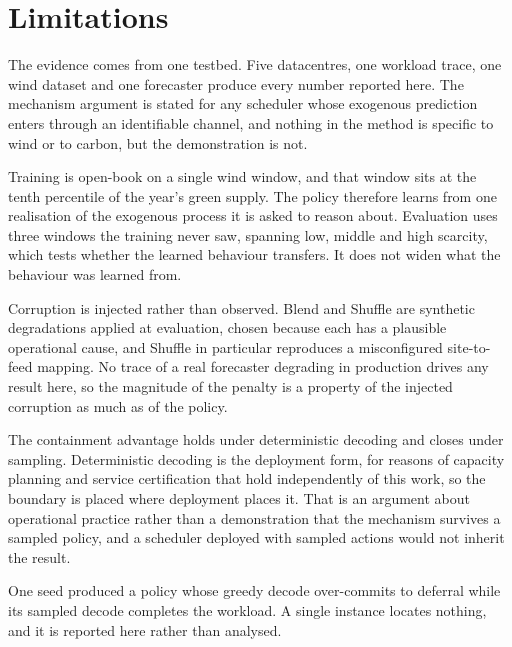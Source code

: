 
\section{Limitations}
\label{sec:limitations}
The evidence comes from one testbed. Five datacentres, one workload trace, one wind dataset and one forecaster produce every number reported here. The mechanism argument is stated for any scheduler whose exogenous prediction enters through an identifiable channel, and nothing in the method is specific to wind or to carbon, but the demonstration is not.

Training is open-book on a single wind window, and that window sits at the tenth percentile of the year's green supply. The policy therefore learns from one realisation of the exogenous process it is asked to reason about. Evaluation uses three windows the training never saw, spanning low, middle and high scarcity, which tests whether the learned behaviour transfers. It does not widen what the behaviour was learned from.

Corruption is injected rather than observed. Blend and Shuffle are synthetic degradations applied at evaluation, chosen because each has a plausible operational cause, and Shuffle in particular reproduces a misconfigured site-to-feed mapping. No trace of a real forecaster degrading in production drives any result here, so the magnitude of the penalty is a property of the injected corruption as much as of the policy.

The containment advantage holds under deterministic decoding and closes under sampling. Deterministic decoding is the deployment form, for reasons of capacity planning and service certification that hold independently of this work, so the boundary is placed where deployment places it. That is an argument about operational practice rather than a demonstration that the mechanism survives a sampled policy, and a scheduler deployed with sampled actions would not inherit the result.

\ifFragileNone\else\ifFragilePattern\else
One seed produced a policy whose greedy decode over-commits to deferral while its sampled decode completes the workload. A single instance locates nothing, and it is reported here rather than analysed.
\fi\fi

